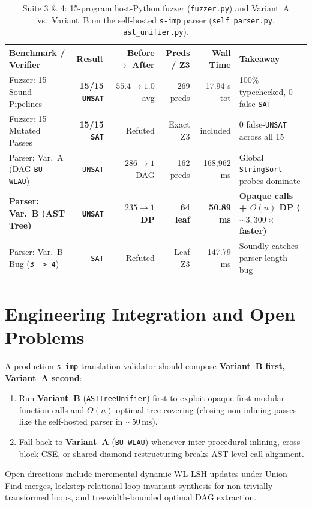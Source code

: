 \documentclass[11pt,a4paper]{article}
\begin{document}
\begin{table}[!htbp]
\centering
\caption{Suite 3 \& 4: 15-program host-Python fuzzer (\texttt{fuzzer.py}) and Variant~A vs.\ Variant~B on the self-hosted \texttt{s-imp} parser (\texttt{self\_parser.py}, \texttt{ast\_unifier.py}).}
\label{tab:fuzz_ab}
\footnotesize
\begin{tabularx}{\linewidth}{@{}lrrrrl@{}}
\toprule
\textbf{Benchmark / Verifier} & \textbf{Result} & \textbf{Before $\to$ After} & \textbf{Preds / Z3} & \textbf{Wall Time} & \textbf{Takeaway} \\
\midrule
Fuzzer: 15 Sound Pipelines & \textbf{15/15 \texttt{UNSAT}} & $55.4 \to 1.0$ avg & 269 preds & 17.94 s tot & 100\% typechecked, 0 false-\texttt{SAT} \\
Fuzzer: 15 Mutated Passes & \textbf{15/15 \texttt{SAT}} & Refuted & Exact Z3 & included & 0 false-\texttt{UNSAT} across all 15 \\
Parser: Var.~A (DAG \texttt{BU-WLAU}) & \texttt{UNSAT} & $286 \to 1$ DAG & 162 preds & 168,962 ms & Global \texttt{StringSort} probes dominate \\
\textbf{Parser: Var.~B (AST Tree)} & \textbf{\texttt{UNSAT}} & \textbf{$235 \to 1$ DP} & \textbf{64 leaf} & \textbf{50.89 ms} & \textbf{Opaque calls + $O(n)$ DP ($\sim 3{,}300\times$ faster)} \\
Parser: Var.~B Bug (\texttt{3 -> 4}) & \texttt{SAT} & Refuted & Leaf Z3 & 147.79 ms & Soundly catches parser length bug \\
\bottomrule
\end{tabularx}
\end{table}

\section{Engineering Integration and Open Problems}
\label{sec:future}

A production \texttt{s-imp} translation validator should compose \textbf{Variant~B first, Variant~A second}:
\begin{enumerate}
  \item Run \textbf{Variant~B} (\texttt{ASTTreeUnifier}) first to exploit opaque-first modular function calls and $O(n)$ optimal tree covering (closing non-inlining passes like the self-hosted parser in $\sim 50\,\text{ms}$).
  \item Fall back to \textbf{Variant~A} (\texttt{BU-WLAU}) whenever inter-procedural inlining, cross-block CSE, or shared diamond restructuring breaks AST-level call alignment.
\end{enumerate}
Open directions include incremental dynamic WL-LSH updates under Union-Find merges, lockstep relational loop-invariant synthesis for non-trivially transformed loops, and treewidth-bounded optimal DAG extraction.
\end{document}
